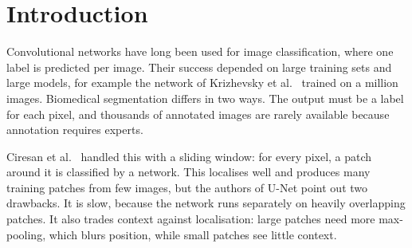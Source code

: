 \documentclass{article}
\begin{document}

\printAffiliationsAndNotice{}

\begin{abstract}
This text summarises the U-Net paper by Ronneberger et al.~, which addresses segmentation of biomedical images, that is, assigning a class to every pixel, when only a few annotated images exist. The authors combine a symmetric encoder--decoder network with copied high-resolution features, heavy elastic-deformation augmentation, and a loss that gives extra weight to thin borders between touching cells. I describe the architecture, the training procedure and the reported results, and then discuss what the paper leaves open, in particular the absence of ablation studies. As a side note, I started studying this paper during a deep learning lecture, which earned me a candy.
\end{abstract}

\section{Introduction}
Convolutional networks have long been used for image classification, where one label is predicted per image. Their success depended on large training sets and large models, for example the network of Krizhevsky et al.~ trained on a million images. Biomedical segmentation differs in two ways. The output must be a label for each pixel, and thousands of annotated images are rarely available because annotation requires experts.

Ciresan et al.~ handled this with a sliding window: for every pixel, a patch around it is classified by a network. This localises well and produces many training patches from few images, but the authors of U-Net point out two drawbacks. It is slow, because the network runs separately on heavily overlapping patches. It also trades context against localisation: large patches need more max-pooling, which blurs position, while small patches see little context.
\end{document}
